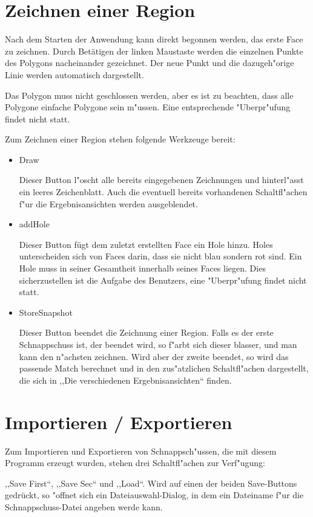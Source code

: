 \section{Zeichnen einer Region}
Nach dem Starten der Anwendung kann direkt begonnen werden, das erste Face zu zeichnen. Durch Betätigen der linken Maustaste werden die einzelnen Punkte des Polygons nacheinander gezeichnet. Der neue Punkt und die dazugeh"orige Linie werden automatisch dargestellt. 

Das Polygon muss nicht geschlossen werden, aber es ist zu beachten, dass alle Polygone einfache Polygone sein m"ussen. Eine entsprechende "Uberpr"ufung findet nicht statt.

Zum Zeichnen einer Region stehen folgende Werkzeuge bereit:
\begin{itemize}
\item Draw

Dieser Button l"oscht alle bereits eingegebenen Zeichnungen und hinterl"asst ein leeres Zeichenblatt. Auch die eventuell bereits vorhandenen Schaltfl"achen f"ur die Ergebnisansichten werden ausgeblendet.

\item addHole

Dieser Button fügt dem zuletzt erstellten Face ein Hole hinzu. Holes unterscheiden sich von Faces darin, dass sie nicht blau sondern rot sind. Ein Hole muss in seiner Gesamtheit innerhalb seines Faces liegen. Dies sicherzustellen ist die Aufgabe des Benutzers, eine "Uberpr"ufung findet nicht statt.

\item StoreSnapshot

Dieser Button beendet die Zeichnung einer Region. Falls es der erste Schnappschuss ist, der beendet wird, so f"arbt sich dieser blasser, und man  kann den n"achsten zeichnen. Wird aber der zweite beendet, so wird das passende Match berechnet und in den zus"atzlichen Schaltfl"achen dargestellt, die sich in ,,Die verschiedenen Ergebnisansichten`` finden.
\end{itemize} 

\section{Importieren / Exportieren}
Zum Importieren und Exportieren von Schnappsch"ussen, die mit diesem Programm erzeugt wurden, stehen drei Schaltfl"achen zur Verf"ugung:

,,Save First``, ,,Save Sec`` und ,,Load``. Wird auf einen der beiden Save-Buttons gedrückt, so "offnet sich ein Dateiauswahl-Dialog, in dem ein Dateiname f"ur die Schnappschuss-Datei angeben werde kann.

